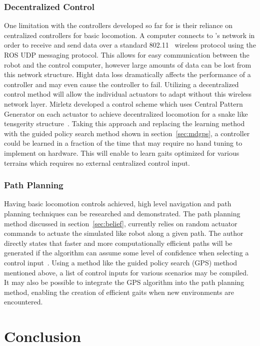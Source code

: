 \subsubsection{Decentralized Control}
One limitation with the controllers developed so far for \SB{} is their reliance on centralized controllers for basic locomotion.
A computer connects to \SB{}'s network in order to receive and send data over a standard 802.11~\cite{ieee1997wireless} wireless protocol using the ROS UDP messaging protocol.
This allows for easy communication between the robot and the control computer, however large amounts of data can be lost from this network structure.
Hight data loss dramatically affects the performance of a controller and may even cause the controller to fail.
Utilizing a decentralized control method will allow the individual actuators to adapt without this wireless network layer.
Mirletz \etal developed a control scheme which uses Central Pattern Generator on each actuator to achieve decentralized locomotion for a snake like tensgerity structure~\cite{mirletz2015goal}.
Taking this approach and replacing the learning method with the guided policy search method shown in section~\ref{sec:mdgps}, a controller could be learned in a fraction of the time that may require no hand tuning to implement on hardware.
This will enable \SB{} to learn gaits optimized for various terrains which requires no external centralized control input.

\subsubsection{Path Planning}
Having basic locomotion controls achieved, high level navigation and path planning techniques can be researched and demonstrated.
The path planning method discussed in section~\ref{sec:belief}, currently relies on random actuator commands to actuate the simulated \SB{} like robot along a given path.
The author directly states that faster and more computationally efficient paths will be generated if the algorithm can assume some level of confidence when selecting a control input~\cite{littlefieldintegrating}.
Using a method like the guided policy search (GPS) method mentioned above, a list of control inputs for various scenarios may be compiled.
It may also be possible to integrate the GPS algorithm into the path planning method, enabling the creation of efficient gaits when new environments are encountered.

\section{Conclusion}

